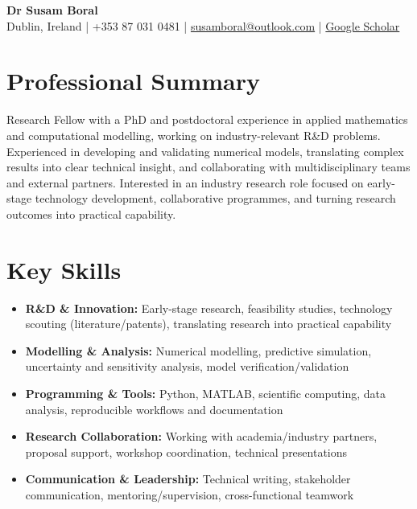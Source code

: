 \documentclass[10pt,a4paper]{article}
\begin{document}
{\LARGE \textbf{Dr Susam Boral}}\\[-2pt]
Dublin, Ireland \;|\; +353 87 031 0481 \;|\; \href{mailto:susamboral@outlook.com}{susamboral@outlook.com} \;|\;
\href{https://scholar.google.com/citations?user=lxZzGV8AAAAJ&hl=en}{Google Scholar}
\vspace{6pt}

\section*{Professional Summary}
Research Fellow with a PhD and postdoctoral experience in applied mathematics and computational modelling, working on industry-relevant R\&D problems. Experienced in developing and validating numerical models, translating complex results into clear technical insight, and collaborating with multidisciplinary teams and external partners. Interested in an industry research role focused on early-stage technology development, collaborative programmes, and turning research outcomes into practical capability.

\section*{Key Skills}
\begin{itemize}
  \item \textbf{R\&D \& Innovation:} Early-stage research, feasibility studies, technology scouting (literature/patents), translating research into practical capability
  \item \textbf{Modelling \& Analysis:} Numerical modelling, predictive simulation, uncertainty and sensitivity analysis, model verification/validation
  \item \textbf{Programming \& Tools:} Python, MATLAB, scientific computing, data analysis, reproducible workflows and documentation
  \item \textbf{Research Collaboration:} Working with academia/industry partners, proposal support, workshop coordination, technical presentations
  \item \textbf{Communication \& Leadership:} Technical writing, stakeholder communication, mentoring/supervision, cross-functional teamwork
\end{itemize}
\end{document}
